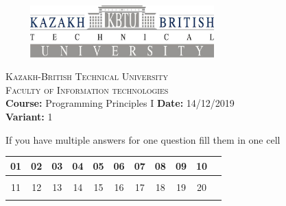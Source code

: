 \documentclass[11pt]{article}
\begin{document}
\Large

\begin{center}
\includegraphics[width=9cm, height=2cm]{kbtu.jpg}
\end{center}

\begin{center}
	\begin{minipage}{11.4cm}
		\begin{center}
				{\small \textsc{Kazakh-British Technical University}			\\
						  \textsc{Faculty of Information technologies} \\
                         \textbf{Course:} Programming Principles I \hspace{.65cm}\textbf{Date:} 14/12/2019\\\textbf{Variant:} 1\\
                }
		\end{center}
	\end{minipage}
\end{center}

{If you have multiple answers for one question fill them in one cell}
\begin{center} 
    \begin{tabular}{ |c|c|c|c|c|c|c|c|c|c|c|}
 \hline
 01 & 02 & 03 & 04 & 05 & 06 & 07 & 08 & 09 & 10 \\ 
  \hline
   &&&&&&&&& \\ 
 \hline
  11 & 12 & 13 & 14 & 15 & 16 & 17 & 18 & 19 & 20\\ 
  \hline
  &&&&&&&&& \\ 
 \hline
\end{tabular}
\end{center}
\end{document}
